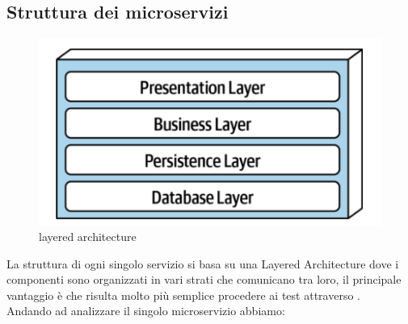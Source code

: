 \subsection{Struttura dei microservizi}\label{StrutturaMicroservizi}
\begin{figure}[H]
	\centering
	\includegraphics[scale=0.4]{Immagini/Backend/layer.png}
	\caption{layered architecture}
	\label{fig:layer}
\end{figure}
La struttura di ogni singolo servizio si basa su una Layered Architecture dove i componenti sono organizzati in vari strati che comunicano tra loro, il principale vantaggio è che risulta molto più semplice procedere ai test attraverso . \\
Andando ad analizzare il singolo microservizio abbiamo:
